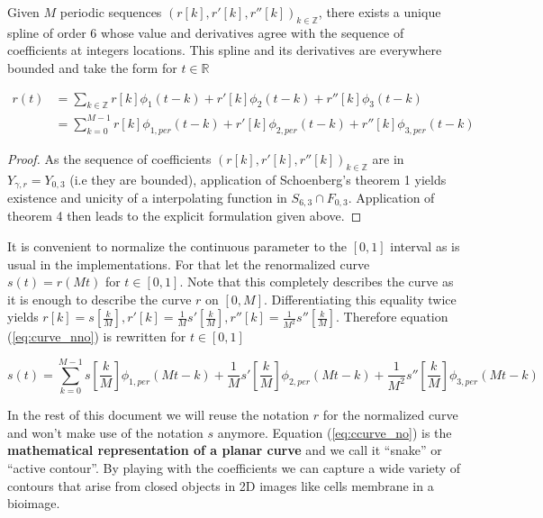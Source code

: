 \documentclass[a4paper, 11pt]{article}
\begin{document}
\begin{cor}{1}
  Given $M$ periodic sequences  ${(r[k], r'[k], r''[k])}_{k \in \mathbb{Z}}$, there exists a unique spline of order $6$ 
  whose value and derivatives agree with the sequence of coefficients at integers locations. This spline and its 
  derivatives are everywhere bounded and take the form for $t \in \mathbb{R}$

\begin{align}
  r(t) &= \sum_{k \in \mathbb{Z}} r[k] \phi_1(t-k) + r'[k] \phi_2(t-k) + r''[k] \phi_3(t-k) \\
  &= \sum_{k=0}^{M-1} r[k] \phi_{1, per}(t-k) + r'[k] \phi_{2, per}(t-k) + r''[k] \phi_{3, per}(t-k) 
  \label{eq:curve_nno}
\end{align}

\end{cor}

\begin{proof}
As the sequence of coefficients ${(r[k], r'[k], r''[k])}_{k \in \mathbb{Z}}$  are in $Y_{\gamma, r} = Y_{0, 3}$ (i.e 
they are bounded), application of Schoenberg's theorem 1 yields existence and unicity of a interpolating function in 
$S_{6,3} \cap F_{0, 3}$. Application of theorem 4 then leads to the explicit formulation given above.
\end{proof}

\begin{remark}{1} It is convenient to normalize the continuous parameter to the $[0,1]$ interval as is usual in the 
  implementations.  For that let the renormalized curve $s(t) = r(Mt)$ for $t \in [0,1]$. Note that this completely 
  describes the curve as it is enough to describe the curve $r$ on $[0,M]$. Differentiating this equality twice yields 
  $r[k] = s[\frac{k}{M}], r'[k] = \frac{1}{M} s'[\frac{k}{M}], r''[k] = \frac{1}{M^2} s''[\frac{k}{M}]$. Therefore 
  equation (\ref{eq:curve_nno}) is rewritten for $t \in [0,1]$

\begin{equation}
  \label{eq:ccurve_no}
  s(t) = \sum_{k=0}^{M-1} s[\frac{k}{M}] \phi_{1, per}(Mt-k) + \frac{1}{M} s'[\frac{k}{M}] \phi_{2, per}(Mt-k) + 
  \frac{1}{M^2} s''[\frac{k}{M}] \phi_{3, per}(Mt-k)
\end{equation}

\end{remark}

In the rest of this document we will reuse the notation $r$ for the normalized curve and won't make use of the notation 
$s$ anymore. Equation (\ref{eq:ccurve_no}) is the \textbf{mathematical representation of a planar curve} and we call it 
“snake” or “active contour”. By playing with the coefficients we can capture a wide variety of contours that arise from 
closed objects in 2D images like cells membrane in a bioimage. 
\end{document}
